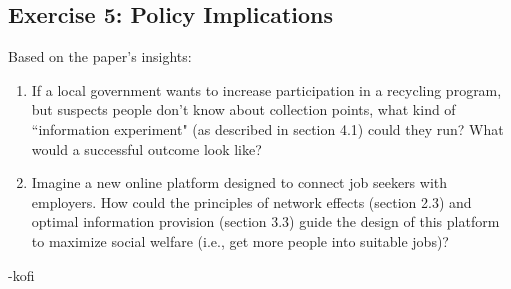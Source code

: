 \documentclass{article}
\begin{document}
\subsection*{Exercise 5: Policy Implications}
Based on the paper's insights:
\begin{enumerate}
    \item  If a local government wants to increase participation in a recycling program, but suspects people don't know about collection points, what kind of ``information experiment" (as described in section 4.1) could they run? What would a successful outcome look like?
    \item  Imagine a new online platform designed to connect job seekers with employers. How could the principles of network effects (section 2.3) and optimal information provision (section 3.3) guide the design of this platform to maximize social welfare (i.e., get more people into suitable jobs)?
\end{enumerate}

-kofi
\end{document}
